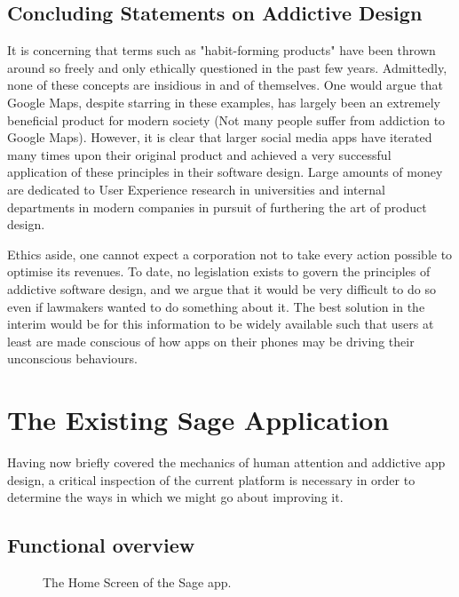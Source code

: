 \subsection{Concluding Statements on Addictive Design}
It is concerning that terms such as "habit-forming products" have been thrown around so freely and only ethically questioned in the past few years. Admittedly, none of these concepts are insidious in and of themselves. One would argue that Google Maps, despite starring in these examples, has largely been an extremely beneficial product for modern society (Not many people suffer from addiction to Google Maps). However, it is clear that larger social media apps have iterated many times upon their original product and achieved a very successful application of these principles in their software design. Large amounts of money are dedicated to User Experience research in universities and internal departments in modern companies in pursuit of furthering the art of product design.

Ethics aside, one cannot expect a corporation not to take every action possible to optimise its revenues. To date, no legislation exists to govern the principles of addictive software design, and we argue that it would be very difficult to do so even if lawmakers wanted to do something about it. The best solution in the interim would be for this information to be widely available such that users at least are made conscious of how apps on their phones may be driving their unconscious behaviours.

\section{The Existing Sage Application}
Having now briefly covered the mechanics of human attention and addictive app design, a critical inspection of the current platform is necessary in order to determine the ways in which we might go about improving it.

\subsection{Functional overview}
\begin{figure}[h]
    \begin{center}
        \fbox{\rule{0pt}{1.2in} \rule{0.99\linewidth}{0pt}}
    \end{center}
    \caption{The Home Screen of the Sage app.}
    \label{fig:sage_home_old}
\end{figure}

